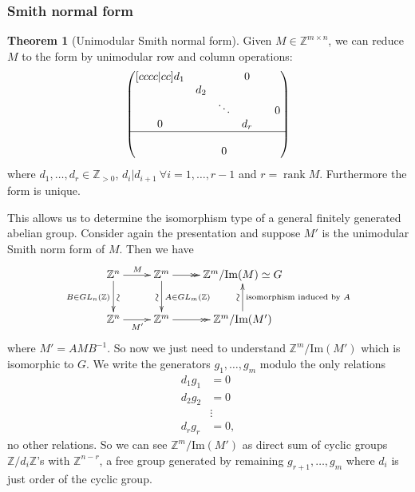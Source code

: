 \documentclass[a4paper]{article}
\newcommand{\rank}{\operatorname{rank}}
\theoremstyle{definition}
\newtheorem{thm}[defn]{Theorem}
\begin{document}
\subsubsection{Smith normal form}
\begin{thm}[Unimodular Smith normal form]
Given $M\in \mathbb Z^{m\times n}$, we can reduce $M$ to the form by unimodular row and column operations:
\[
\begin{pmatrix}[cccc|cc]
d_1 & & & 0 & \\
& d_2 &&& \\
& & \ddots & & & 0 \\
0 & & & d_r \\ \hline &&&&&\\
& & 0 & & &
\end{pmatrix}
\]
where $d_1,\ldots,d_r\in \mathbb Z_{>0}$, $d_i | d_{i+1} \ \forall i=1,\ldots,r-1$ and $r=\rank M$. Furthermore the form is unique.
\end{thm}
This allows us to determine the isomorphism type of a general finitely generated abelian group. Consider again the presentation and suppose $M'$ is the unimodular Smith norm form of $M$. Then we have
\[
\xymatrix{
\mathbb Z^n \ar[r]^{M} \ar[d]_{B\in GL_n(\mathbb Z)}^{\rotatebox{90}{$\sim$}} & \mathbb Z^m\ar@{-{>>}}[r] \ar[d]^{A\in GL_m(\mathbb Z)}_{\rotatebox{-90}{$\sim$}} & {\mathbb Z^m / \text{Im}( M)} \simeq G \\
\mathbb Z^n\ar[r]_{M'} & \mathbb Z^m \ar@{-{>>}}[r] & \mathbb Z^m/\text{Im}(M') \ar[u]^{\rotatebox{-90}{$\sim$}}_{\text{isomorphism induced by }A}
}
\]
where $M'=AMB^{-1}$. So now we just need to understand $\mathbb Z^m/\text{Im}(M')$ which is isomorphic to $G$. We write the generators $g_1,\ldots,g_m$ modulo the only relations
\[
\begin{aligned}
    d_1 g_1&=0 \\
    d_2 g_2&=0 \\
    &\vdots \\
    d_r g_r&=0,
\end{aligned}
\]
no other relations. So we can see $\mathbb Z^m / \text{Im}(M')$ as direct sum of cyclic groups $\mathbb Z/d_i \mathbb Z$'s with $\mathbb Z^{n-r}$, a free group generated by remaining $g_{r+1},\ldots,g_m$ where $d_i$ is just order of the cyclic group.
\end{document}
